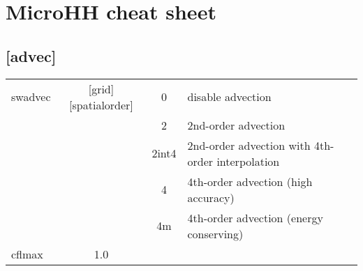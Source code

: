 \documentclass[a4paper,10pt]{extarticle}
\begin{document}
\section*{MicroHH cheat sheet}
\subsection*{[advec]}
\tablelasttail{\hline}
\begin{supertabular}{lccl}
swadvec       & [grid][spatialorder] & 0     & disable advection \\ 
              &                      & 2     & 2nd-order advection \\
              &                      & 2int4 & 2nd-order advection with 4th-order interpolation \\  
              &                      & 4     & 4th-order advection (high accuracy) \\
              &                      & 4m    & 4th-order advection (energy conserving) \\
cflmax        & 1.0   &    \\
\end{supertabular}
\end{document}
